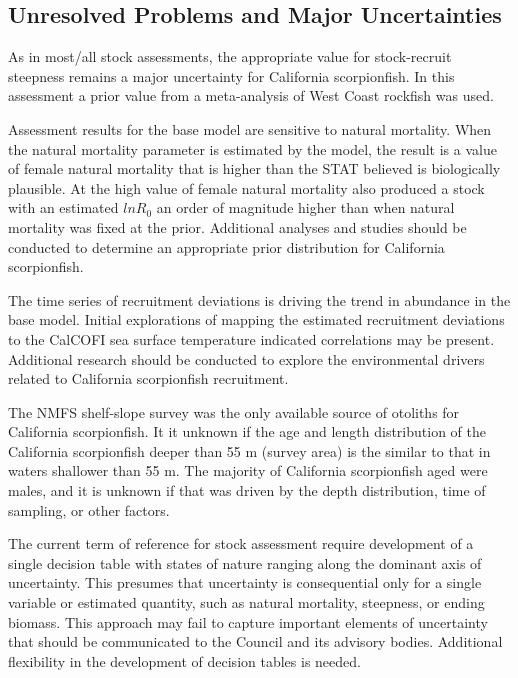 \documentclass[12pt,]{article}
\begin{document}
\subsection*{Unresolved Problems and Major
Uncertainties}\label{unresolved-problems-and-major-uncertainties}

As in most/all stock assessments, the appropriate value for
stock-recruit steepness remains a major uncertainty for California
scorpionfish. In this assessment a prior value from a meta-analysis of
West Coast rockfish was used.

Assessment results for the base model are sensitive to natural
mortality. When the natural mortality parameter is estimated by the
model, the result is a value of female natural mortality that is higher
than the STAT believed is biologically plausible. At the high value of
female natural mortality also produced a stock with an estimated
\(lnR_0\) an order of magnitude higher than when natural mortality was
fixed at the prior. Additional analyses and studies should be conducted
to determine an appropriate prior distribution for California
scorpionfish.

The time series of recruitment deviations is driving the trend in
abundance in the base model. Initial explorations of mapping the
estimated recruitment deviations to the CalCOFI sea surface temperature
indicated correlations may be present. Additional research should be
conducted to explore the environmental drivers related to California
scorpionfish recruitment.

The NMFS shelf-slope survey was the only available source of otoliths
for California scorpionfish. It it unknown if the age and length
distribution of the California scorpionfish deeper than 55 m (survey
area) is the similar to that in waters shallower than 55 m. The majority
of California scorpionfish aged were males, and it is unknown if that
was driven by the depth distribution, time of sampling, or other
factors.

The current term of reference for stock assessment require development
of a single decision table with states of nature ranging along the
dominant axis of uncertainty. This presumes that uncertainty is
consequential only for a single variable or estimated quantity, such as
natural mortality, steepness, or ending biomass. This approach may fail
to capture important elements of uncertainty that should be communicated
to the Council and its advisory bodies. Additional flexibility in the
development of decision tables is needed.
\end{document}
